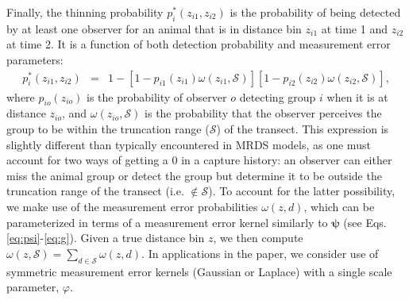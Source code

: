 \documentclass[aoas,preprint]{imsart}
\numberwithin{equation}{section}
\theoremstyle{plain}
\begin{document}
Finally, the thinning probability
$p_i^*(z_{i1},z_{i2})$ is the probability of being detected by at least one observer for an animal that is in distance bin $z_{i1}$ at time 1 and $z_{i2}$ at time 2. It is a function of both detection probability and measurement error parameters:
\begin{eqnarray*}
  \label{eq:pstar}
  p_i^*(z_{i1},z_{i2}) & = &
  1 - [1- p_{i1}(z_{i1}) \omega(z_{i1},\mathcal{S})][1-p_{i2}(z_{i2})\omega(z_{i2},\mathcal{S})],
\end{eqnarray*}
where $p_{io}(z_{io})$ is the probability of observer $o$ detecting group $i$ when it is at distance $z_{io}$, and $\omega(z_{io},\mathcal{S})$ is the probability that the observer perceives the group to be within the truncation range ($\mathcal{S}$) of the transect.  This expression is slightly different than typically encountered in MRDS models, as one must account for two ways of getting a 0 in a capture history: an observer can either miss the animal group or detect the group but determine it to be outside the truncation range of the transect (i.e. $\notin \mathcal{S}$).  To account for the latter possibility, we make use of the measurement error probabilities $\omega(z,d)$, which can be parameterized in terms of a measurement error kernel similarly to $\boldsymbol{\psi}$ (see Eqs. \ref{eq:psi}-\ref{eq:g}). Given a true distance bin $z$, we then compute $\omega(z,\mathcal{S})=\sum_{d \in \mathcal{S}} \omega(z,d)$. In applications in the paper, we consider use of symmetric measurement error kernels (Gaussian or Laplace) with a single scale parameter, $\varphi$.
\end{document}
